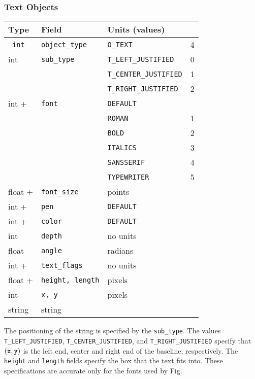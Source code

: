 \subsubsection{Text Objects}

\begin{center}
\begin{tabular}{|l|l|ll|}
\hline
Type 	& Field			& Units (values) 		&	\\ \hline
\hline
\tt
int	& {\tt object\_type}	& {\tt O\_TEXT}			& 4	\\ \hline
%
int	& {\tt sub\_type}	& {\tt T\_LEFT\_JUSTIFIED}	& 0	\\
	&			& {\tt T\_CENTER\_JUSTIFIED}	& 1	\\
	&			& {\tt T\_RIGHT\_JUSTIFIED}	& 2	\\
									\hline
%
int +	& {\tt font}		& {\tt DEFAULT}		& 	\\
	&			& {\tt ROMAN}		& 1	\\
	&			& {\tt BOLD}		& 2	\\
	&			& {\tt ITALICS}		& 3	\\
	&			& {\tt SANSSERIF}	& 4	\\
	&			& {\tt TYPEWRITER}	& 5	\\ \hline
%
float +	& {\tt font\_size}	& points		&	\\ \hline
%
int +	& {\tt pen}		& {\tt DEFAULT}		&	\\ \hline
%
int +	& {\tt color}		& {\tt DEFAULT}		&	\\ \hline
%
int  	& {\tt depth}		& no units		&	\\ \hline
%
float	& {\tt angle}		& radians		&	\\ \hline
%
int +	& {\tt text\_flags}	& no units		&	\\ \hline
%
float +	& {\tt height, length}	& pixels		&	\\ \hline
%
int	& {\tt x, y}		& pixels		&	\\ \hline
%
string	& string		& 			&	\\ \hline
\end{tabular}
\end{center}
%
The positioning of the string is specified by the {\tt sub\_type}.
The values {\tt T\_LEFT\_JUSTIFIED}, {\tt T\_CENTER\_JUSTIFIED},
	and {\tt T\_RIGHT\_JUSTIFIED} specify that 
	$({\tt x}, {\tt y})$ is the left end, center and right end
	 of the baseline, respectively.
The {\tt height} and {\tt length} fields specify the box that the
	text fits into.
These specifications are accurate only for the fonts used by Fig.

